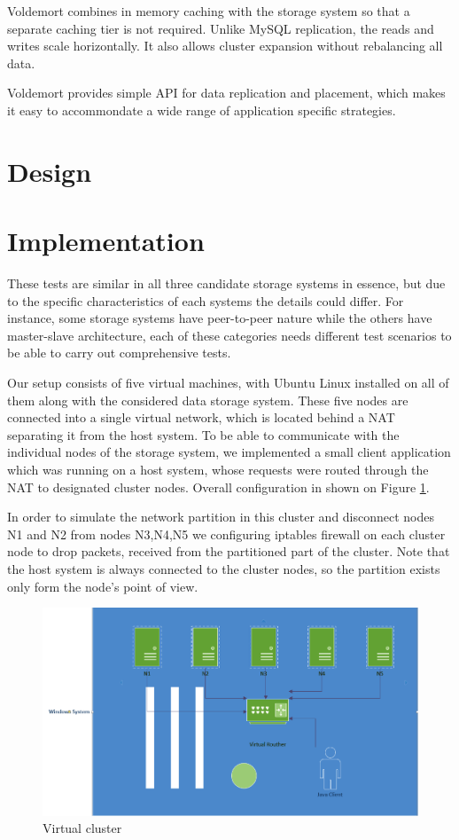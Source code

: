 \documentclass[a4paper]{article}
\begin{document}
Voldemort combines in memory caching with the storage system so that a separate caching tier is not required. Unlike MySQL replication, the reads and writes scale horizontally. It also allows cluster expansion without rebalancing all data.

Voldemort provides simple API for data replication and placement, which makes it easy to accommondate a wide range of application specific strategies.

\section{Design}

\section{Implementation}

These tests are similar in all three candidate storage systems in essence, but due to the specific characteristics of each systems the details could differ. 
For instance, some storage systems have peer-to-peer nature while the others have master-slave architecture, each of these categories needs different test scenarios to be able to carry out comprehensive tests.

Our setup consists of five virtual machines, with Ubuntu Linux installed on all of them along with the considered data storage system. 
These five nodes are connected into a single virtual network, which is located behind a NAT separating it from the host system.
To be able to communicate with the individual nodes of the storage system, we implemented a small client application which was running on a host system, whose requests were routed through the NAT to designated cluster nodes. 
Overall configuration in shown on Figure \ref{fig:cluster}. 

In order to simulate the network partition in this cluster and disconnect nodes N1 and N2 from nodes N3,N4,N5 we configuring iptables firewall on each cluster node to drop packets, received from the partitioned part of the cluster.
Note that the host system is always connected to the cluster nodes, so the partition exists only form the node's point of view.

\begin{figure}[h!]
	\centering
	\includegraphics[width=\textwidth]{cluster}
	\caption{Virtual cluster}
	\label{fig:cluster}
\end{figure}
\end{document}
